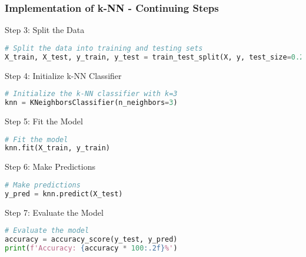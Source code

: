 \documentclass[aspectratio=169]{beamer}
\begin{document}
\begin{frame}[fragile]
    \frametitle{Implementation of k-NN - Continuing Steps}
    \begin{block}{Step 3: Split the Data}
        \begin{lstlisting}[language=Python]
# Split the data into training and testing sets
X_train, X_test, y_train, y_test = train_test_split(X, y, test_size=0.2, random_state=42)
        \end{lstlisting}
    \end{block}

    \begin{block}{Step 4: Initialize k-NN Classifier}
        \begin{lstlisting}[language=Python]
# Initialize the k-NN classifier with k=3
knn = KNeighborsClassifier(n_neighbors=3)
        \end{lstlisting}
    \end{block}

    \begin{block}{Step 5: Fit the Model}
        \begin{lstlisting}[language=Python]
# Fit the model
knn.fit(X_train, y_train)
        \end{lstlisting}
    \end{block}
    
    \begin{block}{Step 6: Make Predictions}
        \begin{lstlisting}[language=Python]
# Make predictions
y_pred = knn.predict(X_test)
        \end{lstlisting}
    \end{block}
    
    \begin{block}{Step 7: Evaluate the Model}
        \begin{lstlisting}[language=Python]
# Evaluate the model
accuracy = accuracy_score(y_test, y_pred)
print(f'Accuracy: {accuracy * 100:.2f}%')
        \end{lstlisting}
    \end{block}
\end{frame}
\end{document}

